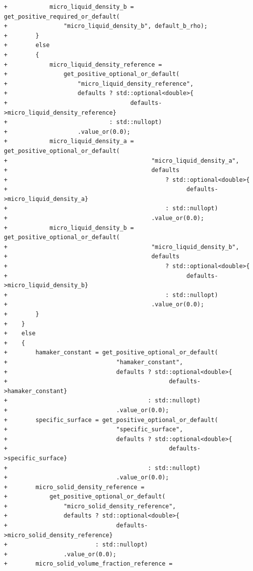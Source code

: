 \documentclass[10pt]{article}
\begin{document}
\begin{lstlisting}
+            micro_liquid_density_b = get_positive_required_or_default(
+                "micro_liquid_density_b", default_b_rho);
+        }
+        else
+        {
+            micro_liquid_density_reference =
+                get_positive_optional_or_default(
+                    "micro_liquid_density_reference",
+                    defaults ? std::optional<double>{
+                                   defaults->micro_liquid_density_reference}
+                             : std::nullopt)
+                    .value_or(0.0);
+            micro_liquid_density_a = get_positive_optional_or_default(
+                                         "micro_liquid_density_a",
+                                         defaults
+                                             ? std::optional<double>{
+                                                   defaults->micro_liquid_density_a}
+                                             : std::nullopt)
+                                         .value_or(0.0);
+            micro_liquid_density_b = get_positive_optional_or_default(
+                                         "micro_liquid_density_b",
+                                         defaults
+                                             ? std::optional<double>{
+                                                   defaults->micro_liquid_density_b}
+                                             : std::nullopt)
+                                         .value_or(0.0);
+        }
+    }
+    else
+    {
+        hamaker_constant = get_positive_optional_or_default(
+                               "hamaker_constant",
+                               defaults ? std::optional<double>{
+                                              defaults->hamaker_constant}
+                                        : std::nullopt)
+                               .value_or(0.0);
+        specific_surface = get_positive_optional_or_default(
+                               "specific_surface",
+                               defaults ? std::optional<double>{
+                                              defaults->specific_surface}
+                                        : std::nullopt)
+                               .value_or(0.0);
+        micro_solid_density_reference =
+            get_positive_optional_or_default(
+                "micro_solid_density_reference",
+                defaults ? std::optional<double>{
+                               defaults->micro_solid_density_reference}
+                         : std::nullopt)
+                .value_or(0.0);
+        micro_solid_volume_fraction_reference =

\end{lstlisting}
\end{document}
